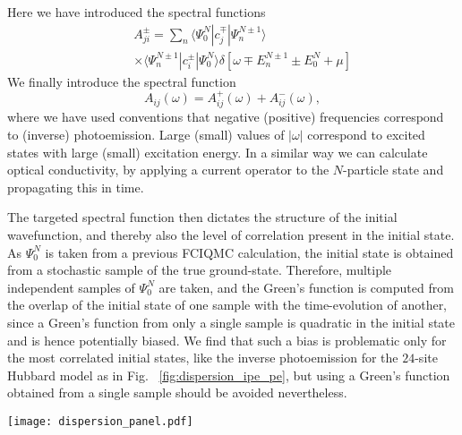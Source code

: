 Here we have introduced the spectral functions
\begin{eqnarray}\label{eq:g5}
&& A^{\pm}_{ji}=\sum_n \langle \Psi_0^N|c^{\mp}_j|\Psi_n^{N\pm 1}\rangle    \\
&&\times \langle \Psi_n^{N\pm 1}|c^{\pm}_i|\Psi_0^N\rangle \delta[\omega\mp E_n^{N\pm 1}\pm E_0^N+\mu] \nonumber
\end{eqnarray}
We finally introduce the spectral function
\begin{equation}\label{eq:g6}
A_{ij}(\omega)=A_{ij}^{+}(\omega)+A_{ij}^{-}(\omega),
\end{equation}
where we have used conventions that negative  (positive) frequencies correspond to (inverse) photoemission.
Large (small) values of $|\omega|$ correspond to excited states with large (small) excitation energy.
In a similar way we can calculate optical conductivity, by applying a current operator
to the $N$-particle state and propagating this in time.

The targeted spectral function then dictates the structure of the initial
wavefunction, and thereby also the level of correlation present in the initial
state.
As $\Psi_0^N$ is taken from a previous FCIQMC calculation, the initial state
is obtained from a stochastic sample of the true ground-state. Therefore, multiple
independent samples of $\Psi_0^N$ are taken, and the Green's function is
computed from the overlap of the initial state of one sample with the
time-evolution of another, since a Green's function from only a single sample
is quadratic in the initial state and is hence potentially biased. We find
that such a bias is problematic only for the most correlated initial states,
like the inverse photoemission for the $24$-site Hubbard model as in
Fig. ~\ref{fig:dispersion_ipe_pe}, but using a Green's function obtained from
a single sample should be avoided nevertheless.

\begin{figure*}
\texttt{[image: dispersion\_panel.pdf]}
\caption{Energy levels of the non-interacting $24$-site Hubbard model with
  lattice vectors (3,3) and (-5,3). The (inverse) photoemission spectrum for $k=(0,0)$ is
  obtained by removing (adding) the electron marked in red. While removing an
  electron with $k=(0,0)$ keeps the determinant with highest weight and
  therefore creates an initial state with a unique high-weight leading
  determinant, this is not the case for the inverse photoemission. As
  $k=(0,0)$ is doubly occupied in the reference determinant of the ground
  state, the latter does not appear in the initial state and we start from a
  enormously correlated state with a high number of determinants with
  comparable weight.}
\label{fig:dispersion_ipe_pe}
\end{figure*}
 
